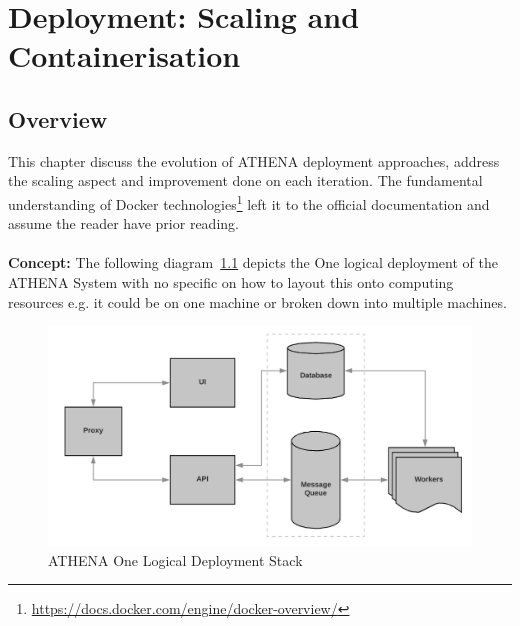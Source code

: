 \chapter{Deployment: Scaling and Containerisation}

\label{Chapter3}

\section{Overview}
This chapter discuss the evolution of ATHENA deployment approaches, address the scaling aspect and improvement done on each iteration. The fundamental understanding of Docker technologies\footnote{\url{https://docs.docker.com/engine/docker-overview/}} left it to the official documentation and assume the reader have prior reading.
\\
\\
\textbf{Concept:} \quad The following diagram~\ref{fig:deployStack} depicts the One logical deployment of the ATHENA System with no specific on how to layout this onto computing resources e.g. it could be on one machine or broken down into multiple machines.

\begin{figure}[H]
\centering
\includegraphics[width=0.5\paperwidth]{Figures/ATHENA_deploy_stack}
\decoRule
\caption[ATHENA Deployment Stack]{ATHENA One Logical Deployment Stack}
\label{fig:deployStack}
\end{figure}

